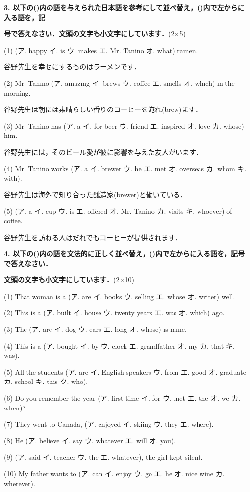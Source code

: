 \noindent \textbf{3.  以下の(\quad)内の語を与えられた日本語を参考にして並べ替え，(\quad)内で左からに入る語を，記}\par\textbf{号で答えなさい．文頭の文字も小文字にしています．}{\scriptsize(2$\times$5)}\par
(1) (ア. happy イ. is ウ. makes エ. Mr. Tanino オ. what) ramen.\par\quad
  谷野先生を幸せにするものはラーメンです．\par
(2) Mr. Tanino (ア. amazing イ. brews ウ. coffee エ. smells オ. which) in the morning.\par\quad
  谷野先生は朝には素晴らしい香りのコーヒーを淹れ(brew)ます．\par
(3) Mr. Tanino has (ア. a イ. for beer ウ. friend エ. inspired オ. love カ. whose) him.\par\quad
  谷野先生には，そのビール愛が彼に影響を与えた友人がいます．\par
(4) Mr. Tanino works (ア. a イ. brewer ウ. he エ. met オ. overseas カ. whom キ. with).\par\quad
  谷野先生は海外で知り合った醸造家(brewer)と働いている．\par
(5) (ア. a イ. cup ウ. is エ. offered オ. Mr. Tanino カ. visits キ. whoever) of coffee.\par\quad
  谷野先生を訪ねる人はだれでもコーヒーが提供されます．\par
\bigskip\bigskip

\noindent \textbf{4.  以下の(\quad)内の語を文法的に正しく並べ替え，(\quad)内で左からに入る語を，記号で答えなさい．}\par\textbf{文頭の文字も小文字にしています．}{\scriptsize(2$\times$10)}\par
(1) That woman is a (ア. are イ. books ウ. selling エ. whose オ. writer) well.\par
(2) This is a (ア. built イ. house ウ. twenty years エ. was オ. which) ago.\par
(3) The (ア. are イ. dog ウ. ears エ. long オ. whose) is mine.\par
(4) This is a (ア. bought イ. by ウ. clock エ. grandfather オ. my カ. that キ. was).\par
(5) All the students (ア. are イ. English speakers ウ. from エ. good オ. graduate カ. school キ. this ク. who).\par
(6) Do you remember the year (ア. first time イ. for ウ. met エ. the オ. we カ. when)?\par
(7) They went to Canada, (ア. enjoyed イ. skiing ウ. they エ. where).\par
(8) He (ア. believe イ. say ウ. whatever エ. will オ. you).\par
(9) (ア. said イ. teacher ウ. the エ. whatever), the girl kept silent.\par
(10) My father wants to (ア. can イ. enjoy ウ. go エ. he オ. nice wine カ. wherever).\par
\bigskip\bigskip

